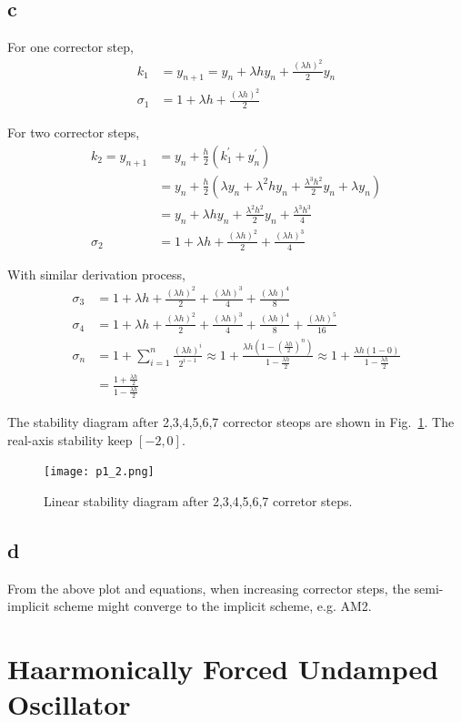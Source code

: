 \documentclass[letterpaper,10pt]{article}
\begin{document}
\subsection{c}
For one corrector step, 
\begin{align*}
  k_1&=y_{n+1}=y_n+\lambda h y_n+\frac{(\lambda h)^2}{2}y_n\\
  \sigma_1&=1+\lambda h+\frac{(\lambda h)^2}{2}
\end{align*}

For two corrector steps, 
\begin{align*}
  k_2=y_{n+1}&=y_n+\frac{h}{2}\left(k_1^{'}+y_n^{'}\right)\\
  &=y_n+\frac{h}{2}\left(\lambda y_n+\lambda^2hy_n+\frac{\lambda^3h^2}{2}y_n+\lambda y_n\right)\\
  &=y_n+\lambda h y_n+\frac{\lambda^2 h^2}{2}y_n+\frac{\lambda^3 h^3}{4}\\
  \sigma_2&=1+\lambda h+\frac{(\lambda h)^2}{2}+\frac{(\lambda h)^3}{4}
\end{align*}

With similar derivation process,  
\begin{align*}
  \sigma_3&=1+\lambda h+\frac{(\lambda h)^2}{2}+\frac{(\lambda h)^3}{4}+\frac{(\lambda h)^4}{8}\\
  \sigma_4&=1+\lambda h+\frac{(\lambda h)^2}{2}+\frac{(\lambda h)^3}{4}+\frac{(\lambda h)^4}{8}+\frac{(\lambda h)^5}{16}\\
  \sigma_n&=1+\sum_{i=1}^{n} \frac{(\lambda h)^i}{2^{i-1}}\approx 1+\frac{\lambda h\left(1-\left(\frac{\lambda h}{2}\right)^n\right)}{1-\frac{\lambda h}{2}}\approx 1+\frac{\lambda h(1-0)}{1-\frac{\lambda h}{2}}\\
  &=\frac{1+\frac{\lambda h}{2}}{1-\frac{\lambda h}{2}}
\end{align*}

The stability diagram after 2,3,4,5,6,7 corrector steops are shown in Fig.~\ref{fig1_2}. The real-axis stability keep $[-2,0]$.
\begin{figure}[h]
  \centering
  \texttt{[image: p1\_2.png]}
  \caption{Linear stability diagram after 2,3,4,5,6,7 corretor steps. }
  \label{fig1_2}
\end{figure}
\subsection{d}
From the above plot and equations, when increasing corrector steps, the semi-implicit scheme might converge to the implicit scheme, e.g. AM2. 
\section{Haarmonically Forced Undamped Oscillator}
\end{document}

